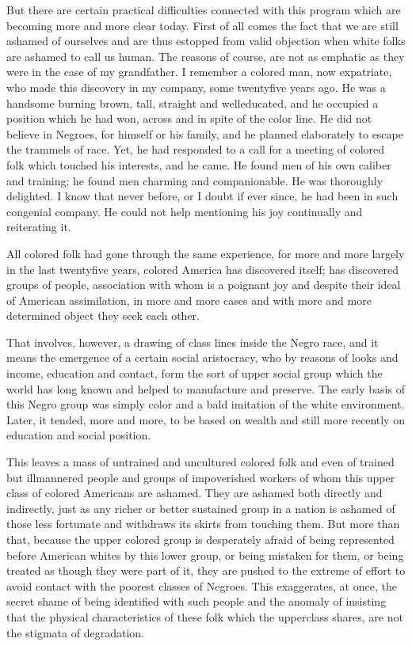\documentclass[letterpaper,10pt,english]{jupyterBook}
\begin{document}
\sphinxAtStartPar
But there are certain practical difficulties connected with this program which are becoming more and more clear today. First of all comes the fact that we are still ashamed of ourselves and are thus estopped from valid objection when white folks are ashamed
to call us human. The reasons of course, are not as emphatic as they were in the case of my grandfather. I remember a colored man, now ex\sphinxhyphen{}patriate, who made this discovery in my company, some twenty\sphinxhyphen{}five years ago. He was a handsome burning brown, tall, straight and well\sphinxhyphen{}educated, and he occupied a position which he had won, across and in spite of the color line. He did not believe in Negroes, for himself or his family, and he planned elaborately to escape the trammels of race. Yet, he had responded to a call for a meeting of colored folk which touched his interests, and he came. He found men of his own caliber and training; he found men charming and companionable. He was thoroughly delighted. I know that never before, or I doubt if ever since, he had been in such congenial company. He could not help mentioning his joy continually and reiterating it.

\sphinxAtStartPar
All colored folk had gone through the same experience, for more and more largely in the last twenty\sphinxhyphen{}five years, colored America has discovered itself; has discovered groups of people, association with whom is a poignant joy and despite their ideal of American assimilation, in more and more cases and with more and more determined object they seek each other.

\sphinxAtStartPar
That involves, however, a drawing of class lines inside the Negro race, and it means the emergence of a certain social aristocracy, who by reasons of looks and income, education and contact, form the sort of upper social group which the world has long known and helped to manufacture and preserve. The early basis of this Negro group was simply color and a bald imitation of the white environment. Later, it tended, more and more, to be based on wealth and still more recently on education and social position.

\sphinxAtStartPar
This leaves a mass of untrained and uncultured colored folk and even of trained but ill\sphinxhyphen{}mannered people and groups of impoverished workers of whom this upper class of colored Americans are ashamed. They are ashamed both directly and indirectly, just as any richer or better sustained group in a nation is ashamed of those less fortunate and withdraws its skirts from touching them. But more than that, because the upper colored group is desperately afraid of being represented before American whites by this lower group, or being mistaken for them, or being treated as though they were part of it, they are pushed to the extreme of effort to avoid contact with the poorest classes of Negroes. This exaggerates, at once, the secret shame of being identified with such people and the anomaly of insisting that the physical characteristics of these folk which the upper\sphinxhyphen{}class shares, are not the stigmata of degradation.
\end{document}
